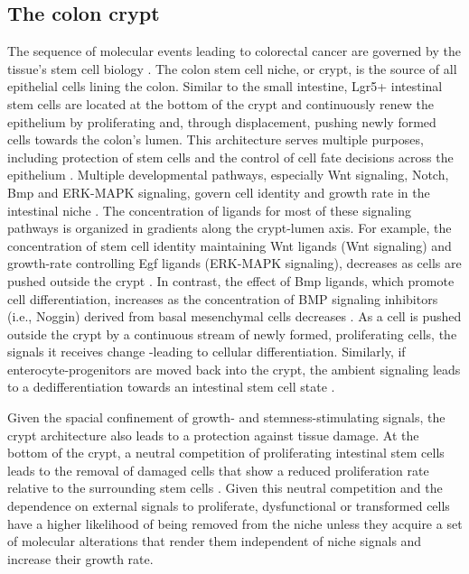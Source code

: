 \begin{flushleft}
\subsection{The colon crypt}
The sequence of molecular events leading to colorectal cancer are governed by the tissue's stem cell biology \parencite{cleversCancerStemCell2011}. The colon stem cell niche, or crypt, is the source of all epithelial cells lining the colon. Similar to the small intestine, Lgr5+ intestinal stem cells are located at the bottom of the crypt and continuously renew the epithelium by proliferating and, through displacement, pushing newly formed cells towards the colon's lumen. This architecture serves multiple purposes, including protection of stem cells and the control of cell fate decisions across the epithelium \parencite{cleversIntestinalCryptPrototype2013a}. Multiple developmental pathways, especially Wnt signaling, Notch, Bmp and ERK-MAPK signaling, govern cell identity and growth rate in the intestinal niche \parencite{hTalesCryptNew2019}. The concentration of ligands for most of these signaling pathways is organized in gradients along the crypt-lumen axis. For example, the concentration of stem cell identity maintaining Wnt ligands (Wnt signaling) and growth-rate controlling Egf ligands (ERK-MAPK signaling), decreases as cells are pushed outside the crypt \parencite{sasakiReg4DeepCrypt2016}. In contrast, the effect of Bmp ligands, which promote cell differentiation, increases as the concentration of BMP signaling inhibitors (i.e., Noggin) derived from basal mesenchymal cells decreases \parencite{heBMPSignalingInhibits2004}. As a cell is pushed outside the crypt by a continuous stream of newly formed, proliferating cells, the signals it receives change -leading to cellular differentiation. Similarly, if enterocyte-progenitors are moved back into the crypt, the ambient signaling leads to a dedifferentiation towards an intestinal stem cell state \parencite{tettehReplacementLostLgr5Positive2016a}. \par

Given the spacial confinement of growth- and stemness-stimulating signals, the crypt architecture also leads to a protection against tissue damage. At the bottom of the crypt, a neutral competition of proliferating intestinal stem cells leads to the removal of damaged cells that show a reduced proliferation rate relative to the surrounding stem cells \parencite{snippertIntestinalCryptHomeostasis2010a}. Given this neutral competition and the dependence on external signals to proliferate, dysfunctional or transformed cells have a higher likelihood of being removed from the niche unless they acquire a set of molecular alterations that render them independent of niche signals and increase their growth rate. \par


\end{flushleft}
